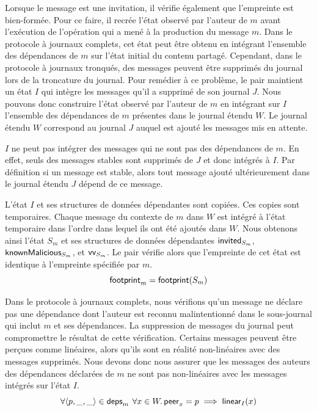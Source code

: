 
Lorsque le message est une invitation, il vérifie également que l'empreinte est bien-formée.
Pour ce faire, il recrée l'état observé par l'auteur de $m$ avant l'exécution de l'opération qui a mené à la production du message $m$.
Dans le protocole à journaux complets, cet état peut être obtenu en intégrant l'ensemble des dépendances de $m$ sur l'état initial du contenu partagé.
Cependant, dans le protocole à journaux tronqués, des messages peuvent être supprimés du journal lors de la troncature du journal.
Pour remédier à ce problème, le pair maintient un état $I$ qui intègre les messages qu'il a supprimé de son journal $J$.
Nous pouvons donc construire l'état observé par l'auteur de $m$ en intégrant sur $I$ l'ensemble des dépendances de $m$ présentes dans le journal étendu $W$.
Le journal étendu $W$ correspond au journal $J$ auquel est ajouté les messages mis en attente.

\begin{remark}
$I$ ne peut pas intégrer des messages qui ne sont pas des dépendances de $m$.
En effet, seuls des messages stables sont supprimés de $J$ et donc intégrés à $I$.
Par définition si un message est stable, alors tout message ajouté ultérieurement dans le journal étendu $J$ dépend de ce message.
\end{remark}

L'état $I$ et ses structures de données dépendantes sont copiées.
Ces copies sont temporaires.
Chaque message du contexte de $m$ dans $W$ est intégré à l'état temporaire dans l'ordre dans lequel ils ont été ajoutés dans $W$.
Nous obtenons ainsi l'état $S_m$ et ses structures de données dépendantes $\operatorname{\mathsf{invited}}_{S_m}$, $\operatorname{\mathsf{knownMalicious}}_{S_m}$, et $\operatorname{\mathsf{vv}}_{S_m}$.
Le pair vérifie alors que l'empreinte de cet état est identique à l'empreinte spécifiée par $m$.
%
\begin{equation}
    \operatorname{\mathsf{footprint}}_m = \operatorname{\mathsf{footprint}}(S_m)
\end{equation}

Dans le protocole à journaux complets, nous vérifions qu'un message ne déclare pas une dépendance dont l'auteur est reconnu malintentionné dans le sous-journal qui inclut $m$ et ses dépendances.
La suppression de messages du journal peut compromettre le résultat de cette vérification.
Certains messages peuvent être perçues comme linéaires, alors qu'ils sont en réalité non-linéaires avec des messages supprimés.
Nous devons donc nous assurer que les messages des auteurs des dépendances déclarées de $m$ ne sont pas non-linéaires avec les messages intégrés sur l'état $I$.
%
\begin{equation}\label{eq:non-linear-I-verif}
    \forall \tuple*{p, \_, \_} \in \trm{deps}_m \:\forall x \in W \qsep \trm{peer}_x = p \implies \trm{linear}_I(x)
\end{equation}


